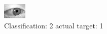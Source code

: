 \begin{figure}[h!]
\begin{center}
\includegraphics[width=0.60\columnwidth]{figures/ID2772_class_2_target_1.png}
\end{center}
\caption{ Classification: 2 actual target: 1}
\label{fig:ID2772_class_2_target_1}
\end{figure}
